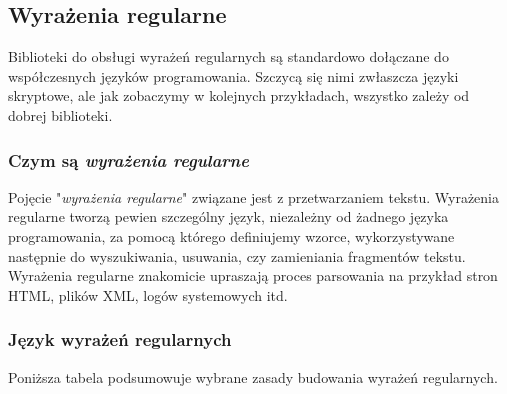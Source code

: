 \subsection{Wyrażenia regularne}

Biblioteki do obsługi wyrażeń regularnych są standardowo dołączane do współczesnych języków
programowania. Szczycą się nimi zwłaszcza języki skryptowe, ale jak zobaczymy w kolejnych przykładach,
wszystko zależy od dobrej biblioteki.

\subsubsection{Czym są {\em wyrażenia regularne}}

Pojęcie "{\em wyrażenia regularne}" związane jest z przetwarzaniem tekstu. Wyrażenia
regularne tworzą pewien szczególny język, niezależny od żadnego języka programowania, za pomocą którego
definiujemy wzorce, wykorzystywane następnie do wyszukiwania, usuwania, czy zamieniania fragmentów tekstu.
Wyrażenia regularne znakomicie upraszają proces parsowania na przykład stron HTML, plików XML, logów
systemowych itd.

\subsubsection{Język wyrażeń regularnych}

Poniższa tabela podsumowuje wybrane zasady budowania wyrażeń regularnych.

